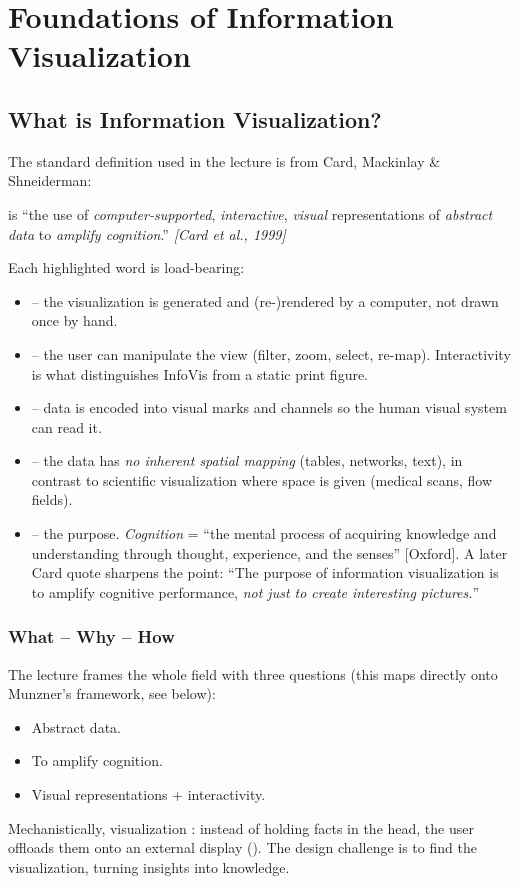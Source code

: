 \section{Foundations of Information Visualization}

\subsection{What is Information Visualization?}

The standard definition used in the lecture is from Card, Mackinlay \& Shneiderman:

\begin{keybox}[Definition]
 is ``the use of \emph{computer-supported},
\emph{interactive}, \emph{visual} representations of \emph{abstract data} to
\emph{amplify cognition}.'' \hfill \textit{[Card et al., 1999]}
\end{keybox}

Each highlighted word is load-bearing:
\begin{itemize}
  \item {} -- the visualization is generated and (re-)rendered by a computer, not drawn once by hand.
  \item {} -- the user can manipulate the view (filter, zoom, select, re-map). Interactivity is what distinguishes InfoVis from a static print figure.
  \item {} -- data is encoded into visual marks and channels so the human visual system can read it.
  \item {} -- the data has \emph{no inherent spatial mapping} (tables, networks, text), in contrast to scientific visualization where space is given (medical scans, flow fields).
  \item {} -- the purpose. \emph{Cognition} = ``the mental process of acquiring knowledge and understanding through thought, experience, and the senses'' [Oxford]. A later Card quote sharpens the point: ``The purpose of information visualization is to amplify cognitive performance, \emph{not just to create interesting pictures.}''
\end{itemize}

\subsubsection{What -- Why -- How}
The lecture frames the whole field with three questions (this maps directly onto Munzner's framework, see below):
\begin{itemize}
  \item {} Abstract data.
  \item {} To amplify cognition.
  \item {} Visual representations + interactivity.
\end{itemize}
Mechanistically, visualization : instead of holding facts in the head, the user offloads them onto an external display (). The design challenge is to find the  visualization, turning insights into knowledge.

